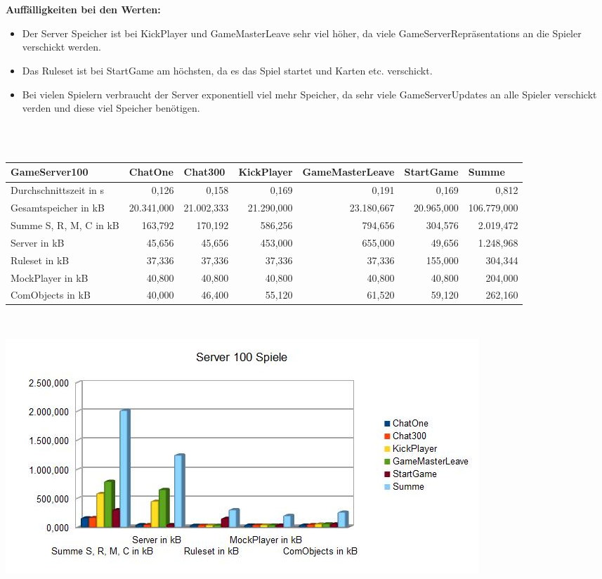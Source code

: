 \documentclass[a4paper]{article}
\begin{document}
\ \\ \ \\
\noindent
\textbf{Auffälligkeiten bei den Werten:}\\
\begin{itemize}
\item Der Server Speicher ist bei KickPlayer und GameMasterLeave sehr viel höher, da viele GameServerRepräsentations an die Spieler verschickt werden.
\item Das Ruleset ist bei StartGame am höchsten, da es das Spiel startet und Karten etc. verschickt.
\item Bei vielen Spielern verbraucht der Server exponentiell viel mehr Speicher, da sehr viele GameServerUpdates an alle Spieler verschickt verden und diese viel Speicher benötigen.

\end{itemize}
 
 \ \\ \ \\

\noindent
\begin{tabular}{|l|r|r|r|r|r|r|}
\hline
GameServer100 & \multicolumn{1}{l|}{ChatOne} & \multicolumn{1}{l|}{Chat300} & \multicolumn{1}{l|}{KickPlayer} & \multicolumn{1}{l|}{GameMasterLeave} & \multicolumn{1}{l|}{StartGame} & \multicolumn{1}{l|}{Summe} \\ \hline \hline
Durchschnittszeit in s & 0,126 & 0,158 & 0,169 & 0,191 & 0,169 & 0,812 \\ \hline
Gesamtspeicher in kB & 20.341,000 & 21.002,333 & 21.290,000 & 23.180,667 & 20.965,000 & 106.779,000 \\ \hline
Summe S, R, M, C in kB & 163,792 & 170,192 & 586,256 & 794,656 & 304,576 & 2.019,472 \\ \hline
Server in kB & 45,656 & 45,656 & 453,000 & 655,000 & 49,656 & 1.248,968 \\ \hline
Ruleset in kB & 37,336 & 37,336 & 37,336 & 37,336 & 155,000 & 304,344 \\ \hline
MockPlayer in kB & 40,800 & 40,800 & 40,800 & 40,800 & 40,800 & 204,000 \\ \hline
ComObjects in kB & 40,000 & 46,400 & 55,120 & 61,520 & 59,120 & 262,160 \\ \hline
\end{tabular}
\ \\
\begin{center}
\includegraphics[scale=0.7]{6}
\end{center}
\end{document}
